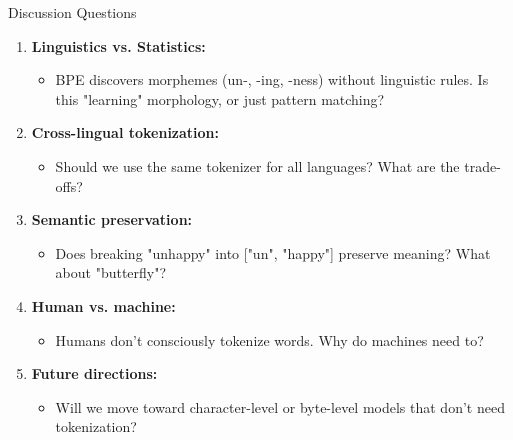 \documentclass[aspectratio=169]{beamer}
\begin{document}
\begin{frame}[shrink=10]{Discussion Questions 💭}
    \begin{enumerate}\setlength{\itemsep}{0pt}
        \item \textbf{Linguistics vs. Statistics:}
        \begin{itemize}\setlength{\itemsep}{0pt}
            \item BPE discovers morphemes (un-, -ing, -ness) without linguistic rules. Is this "learning" morphology, or just pattern matching?
        \end{itemize}

        \item \textbf{Cross-lingual tokenization:}
        \begin{itemize}\setlength{\itemsep}{0pt}
            \item Should we use the same tokenizer for all languages? What are the trade-offs?
        \end{itemize}

        \item \textbf{Semantic preservation:}
        \begin{itemize}\setlength{\itemsep}{0pt}
            \item Does breaking "unhappy" into ["un", "happy"] preserve meaning? What about "butterfly"?
        \end{itemize}

        \item \textbf{Human vs. machine:}
        \begin{itemize}\setlength{\itemsep}{0pt}
            \item Humans don't consciously tokenize words. Why do machines need to?
        \end{itemize}

        \item \textbf{Future directions:}
        \begin{itemize}\setlength{\itemsep}{0pt}
            \item Will we move toward character-level or byte-level models that don't need tokenization?
        \end{itemize}
    \end{enumerate}
\end{frame}
\end{document}
